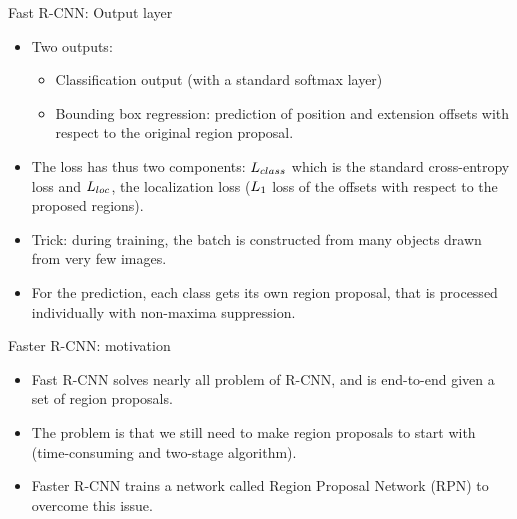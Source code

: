 \documentclass[xcolor=pdftex,dvipsnames,table]{beamer}
\begin{document}
\begin{frame}{Fast R-CNN: Output layer}
\begin{itemize}
\item Two outputs:
\begin{itemize}
	\item Classification output (with a standard softmax layer)
	\item Bounding box regression: prediction of position and extension offsets with respect to the original region proposal. 
\end{itemize}
\item The loss has thus two components: $L_{class}$ which is the standard cross-entropy loss and $L_{loc}$, the localization loss ($L_1$ loss of the offsets with respect to the proposed regions).
\item Trick: during training, the batch is constructed from many objects drawn from very few images. 
\item For the prediction, each class gets its own region proposal, that is processed individually with non-maxima suppression. 
\end{itemize}
\end{frame}


\begin{frame}{Faster R-CNN: motivation}
\begin{itemize}
	\item Fast R-CNN solves nearly all problem of R-CNN, and is end-to-end given a set of region proposals.
	\item The problem is that we still need to make region proposals to start with (time-consuming and two-stage algorithm).
	\item Faster R-CNN \cite{Ren2017} trains a network called Region Proposal Network (RPN) to overcome this issue.
\end{itemize}
\end{frame}
\end{document}
